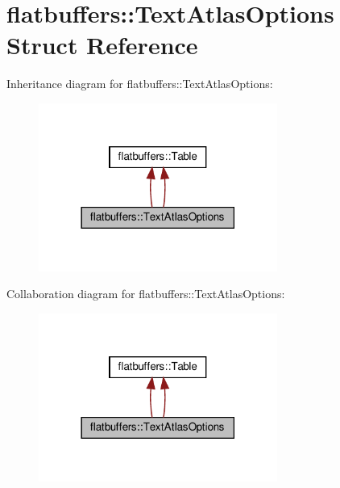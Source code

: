 \hypertarget{structflatbuffers_1_1TextAtlasOptions}{}\section{flatbuffers\+:\+:Text\+Atlas\+Options Struct Reference}
\label{structflatbuffers_1_1TextAtlasOptions}


Inheritance diagram for flatbuffers\+:\+:Text\+Atlas\+Options\+:
\nopagebreak
\begin{figure}[H]
\begin{center}
\leavevmode
\includegraphics[width=222pt]{structflatbuffers_1_1TextAtlasOptions__inherit__graph}
\end{center}
\end{figure}


Collaboration diagram for flatbuffers\+:\+:Text\+Atlas\+Options\+:
\nopagebreak
\begin{figure}[H]
\begin{center}
\leavevmode
\includegraphics[width=222pt]{structflatbuffers_1_1TextAtlasOptions__coll__graph}
\end{center}
\end{figure}
